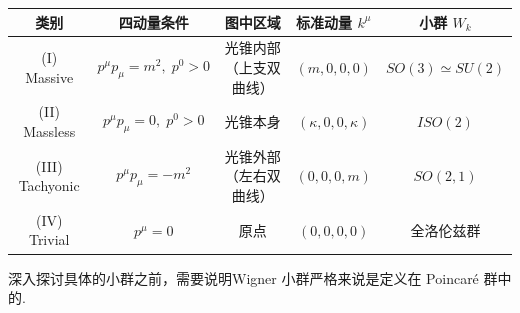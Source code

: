 \begin{center}
            \renewcommand{\arraystretch}{1.8}\label{2}
            \begin{tabular}{|c|c|c|c|c|}
            \hline
            类别
            & 四动量条件
            & 图中区域
            & 标准动量 $k^\mu$
            & 小群 $W_k$ \\ \hline

            (I) Massive
            & $p^\mu p_\mu=m^2,\; p^0>0$
            & 光锥内部（上支双曲线）
            & $(m,0,0,0)$
            & $SO(3)\simeq SU(2)$ \\ \hline

            (II) Massless
            & $p^\mu p_\mu=0,\; p^0>0$
            & 光锥本身
            & $(\kappa,0,0,\kappa)$
            & $ISO(2)$ \\ \hline

            (III) Tachyonic
            & $p^\mu p_\mu=-m^2$
            & 光锥外部（左右双曲线）
            & $(0,0,0,m)$
            & $SO(2,1)$ \\ \hline

            (IV) Trivial
            & $p^\mu=0$
            & 原点
            & $(0,0,0,0)$
            & 全洛伦兹群 \\ \hline

            \end{tabular}
\end{center}
\topictitle{***}\label{total_lorentz_group}
深入探讨具体的小群之前，需要说明Wigner 小群严格来说是定义在 Poincaré 群中的.

